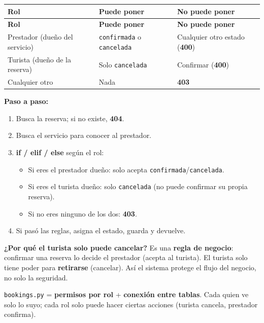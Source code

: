 \documentclass[11pt,a4paper]{article}
\begin{document}
\begin{center}
{\small
\setlength{\tabcolsep}{4pt}
\begin{longtable}{@{}>{\raggedright\arraybackslash}p{3.4cm}>{\raggedright\arraybackslash}p{6.2cm}>{\raggedright\arraybackslash}p{5.3cm}@{}}
\toprule
\textbf{Rol} & \textbf{Puede poner} & \textbf{No puede poner} \\
\midrule
\endfirsthead
\toprule
\textbf{Rol} & \textbf{Puede poner} & \textbf{No puede poner} \\
\midrule
\endhead
Prestador (dueño del servicio) & \texttt{confirmada} o \texttt{cancelada} & Cualquier otro estado (\textbf{400}) \\
Turista (dueño de la reserva) & Solo \texttt{cancelada} & Confirmar (\textbf{400}) \\
Cualquier otro & Nada & \textbf{403} \\
\bottomrule
\end{longtable}
}
\end{center}

\textbf{Paso a paso:}
\begin{enumerate}
    \item Busca la reserva; si no existe, \textbf{404}.
    \item Busca el servicio para conocer al prestador.
    \item \textbf{if / elif / else} según el rol:
    \begin{itemize}
        \item Si eres el prestador dueño: solo acepta \texttt{confirmada}/\texttt{cancelada}.
        \item Si eres el turista dueño: solo \texttt{cancelada} (no puede confirmar su propia reserva).
        \item Si no eres ninguno de los dos: \textbf{403}.
    \end{itemize}
    \item Si pasó las reglas, asigna el estado, guarda y devuelve.
\end{enumerate}

\textbf{¿Por qué el turista solo puede cancelar?} Es una \textbf{regla de negocio}: confirmar una
reserva lo decide el prestador (acepta al turista). El turista solo tiene poder para \textbf{retirarse}
(cancelar). Así el sistema protege el flujo del negocio, no solo la seguridad.

\begin{recuadro}
\texttt{bookings.py} = \textbf{permisos por rol} + \textbf{conexión entre tablas}. Cada quien ve
solo lo suyo; cada rol solo puede hacer ciertas acciones (turista cancela, prestador confirma).
\end{recuadro}
\end{document}

